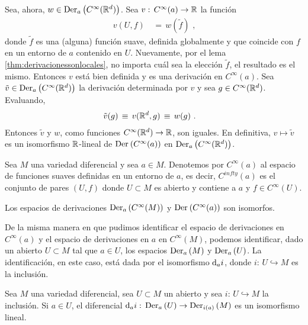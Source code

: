 \begin{obsDerivacionesIsomorfas}
	Sea, ahora, $w\in\derivaciones[a]{C^{\infty}(\bb{R}^{d})}$. Sea
	$v:\,C^{\infty}(a)\rightarrow\bb{R}$ la funci\'{o}n
	\begin{align*}
		v(U,f) & \,=\,w(\tilde{f})
		\text{ ,}
	\end{align*}
	donde $\tilde{f}$ es una (alguna) funci\'{o}n suave, definida
	globalmente y que coincide con $f$ en un entorno de $a$ contenido en
	$U$. Nuevamente, por el lema \ref{thm:derivacionessonlocales},
	no importa cu\'{a}l sea la elecci\'{o}n $\tilde{f}$, el resultado
	es el mismo. Entonces $v$ est\'{a} bien definida y es una
	derivaci\'{o}n en $C^{\infty}(a)$. Sea
	$\tilde{v}\in\derivaciones[a]{C^{\infty}(\bb{R}^{d})}$ la
	derivaci\'{o}n determinada por $v$ y sea $g\in C^{\infty}(\bb{R}^{d})$.
	Evaluando,
	\begin{align*}
		\tilde{v}(g) & \,\equiv\,v(\bb{R}^{d},g) \,\equiv\,w(g)
		\text{ .}
	\end{align*}
	Entonces $\tilde{v}$ y $w$, como funciones $C^{\infty}(\bb{R}^{d})%
	\rightarrow\bb{R}$, son iguales. En definitiva, $v\mapsto\tilde{v}$
	es un isomorfismo $\bb{R}$-lineal de $\derivaciones{C^{\infty}(a)}$
	en $\derivaciones[a]{C^{\infty}(\bb{R}^{d})}$.
\end{obsDerivacionesIsomorfas}

Sea $M$ una variedad diferencial y sea $a\in M$. Denotemos por $C^{\infty}(a)$
al espacio de funciones suaves definidas en un entorno de $a$, es decir,
$C^{infty}(a)$ es el conjunto de pares $(U,f)$ donde $U\subset M$ es
abierto y contiene a $a$ y $f\in C^{\infty}(U)$.

\begin{propoDerivacionesIsomorfasI}\label{thm:derivacionesisomorfasi}
	Los espacios de derivaciones $\derivaciones[a]{C^{\infty}(M)}$ y
	$\derivaciones{C^{\infty}(a)}$ son isomorfos.
\end{propoDerivacionesIsomorfasI}

De la misma manera en que pudimos identificar el espacio de derivaciones en
$C^{\infty}(a)$ y el espacio de derivaciones en $a$ en $C^{\infty}(M)$,
podemos identificar, dado un abierto $U\subset M$ tal que $a\in U$, los
espacios $\derivaciones[a]{M}$ y $\derivaciones[a]{U}$. La
identificaci\'{o}n, en este caso, est\'{a} dada por el isomorfismo
$\diferencial[a]{i}$, donde $i:\,U\hookrightarrow M$ es la inclusi\'{o}n.

\begin{propoDerivacionesIsomorfasII}\label{thm:derivacionesisomorfasii}
	Sea $M$ una variedad diferencial, sea $U\subset M$ un abierto y
	sea $i:\,U\hookrightarrow M$ la inclusi\'{o}n. Si $a\in U$,
	el diferencial $\diferencial[a]{i}:\,\derivaciones[a]{U}\rightarrow%
	\derivaciones[i(a)]{M}$ es un isomorfismo lineal.
\end{propoDerivacionesIsomorfasII}

